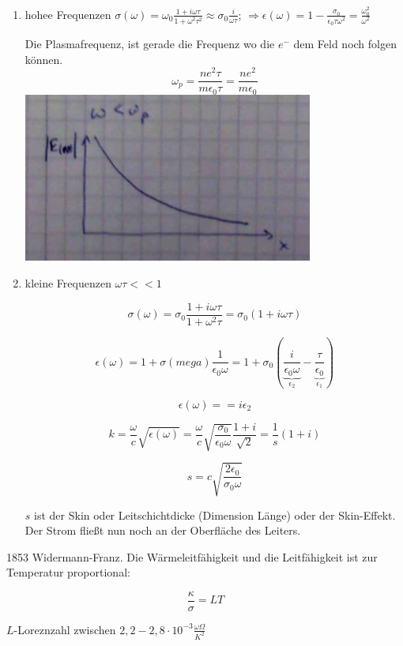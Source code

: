 \begin{enumerate}
\item hohee Frequenzen \(\sigma(\omega) = \omega_0\frac{1+i\omega\tau}{1+\omega^2\tau^2}\approx\sigma_0\frac{i}{\omega\tau}\); \(\Rightarrow \epsilon(\omega) = 1-\frac{\sigma_0}{\epsilon_0\tau\omega^2}=\frac{\omega^2_0}{\omega^2}\)

Die Plasmafrequenz, ist gerade die Frequenz wo die \(e^-\)  dem Feld noch folgen können. 
\[ \omega_p = \frac{ne^2\tau}{m\epsilon_0 \tau}=\frac{ne^2}{m\epsilon_0}\]
\includegraphics[width=0.75\textwidth]{kap06_21.png}

\item kleine Frequenzen \(\omega\tau << 1\)

\[\sigma (\omega) = \sigma_0 \frac{1+i\omega\tau}{1+\omega^2\tau} =  \sigma_0(1+i\omega\tau)\]

\[ \epsilon(\omega) = 1+\sigma(mega)\frac{1}{\epsilon_0\omega} = 1 + \sigma_0(\underbrace{\frac{i}{\epsilon_0\omega}}_{\epsilon_2}-\underbrace{\frac{\tau}{\epsilon_0}}_{\epsilon_1})\]

\[ \epsilon(\omega) = = i\epsilon_2\]

\[ k = \frac{\omega}{c}\sqrt{\epsilon(\omega)} =  \frac{\omega}{c}\sqrt{\frac{\sigma_0}{\epsilon_0 \omega}}\frac{1+i}{\sqrt 2} = \frac{1}{s}(1+i)\]

\[s = c\sqrt{\frac{2\epsilon_0}{\sigma_0\omega}}\]

\(s\) ist der Skin oder Leitschichtdicke (Dimension Länge) oder der Skin-Effekt. Der Strom fließt nun noch an der Oberfläche des Leiters. 

\end{enumerate}


1853 Widermann-Franz. Die Wärmeleitfähigkeit und die Leitfähigkeit ist zur Temperatur proportional:

\[ \frac{\kappa}{\sigma} = LT\]

\(L\)-Loreznzahl zwischen \(2,2-2,8\cdot 10^{-3}\frac{\omega\Omega}{K^2}\)

